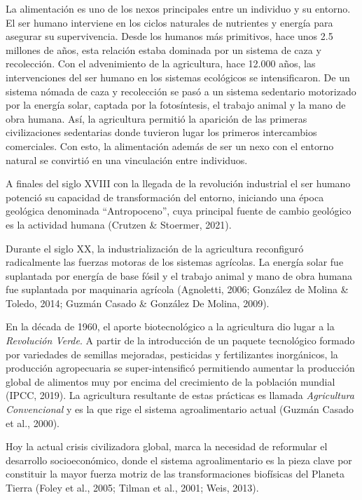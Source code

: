 \documentclass[a4paper, nobind]{templates/ociamthesis}
\begin{document}
La alimentación es uno de los nexos principales entre un individuo y su
entorno. El ser humano interviene en los ciclos naturales de nutrientes
y energía para asegurar su supervivencia. Desde los humanos más
primitivos, hace unos 2.5 millones de años, esta relación estaba
dominada por un sistema de caza y recolección. Con el advenimiento de la
agricultura, hace 12.000 años, las intervenciones del ser humano en los
sistemas ecológicos se intensificaron. De un sistema nómada de caza y
recolección se pasó a un sistema sedentario motorizado por la energía
solar, captada por la fotosíntesis, el trabajo animal y la mano de obra
humana. Así, la agricultura permitió la aparición de las primeras
civilizaciones sedentarias donde tuvieron lugar los primeros
intercambios comerciales. Con esto, la alimentación además de ser un
nexo con el entorno natural se convirtió en una vinculación entre
individuos.

A finales del siglo XVIII con la llegada de la revolución industrial el
ser humano potenció su capacidad de transformación del entorno,
iniciando una época geológica denominada ``Antropoceno'', cuya principal
fuente de cambio geológico es la actividad humana (Crutzen \& Stoermer, 2021).

Durante el siglo XX, la industrialización de la agricultura reconfiguró
radicalmente las fuerzas motoras de los sistemas agrícolas. La energía
solar fue suplantada por energía de base fósil y el trabajo animal y
mano de obra humana fue suplantada por maquinaria agrícola
(Agnoletti, 2006; González de Molina \& Toledo, 2014; Guzmán Casado \& González De Molina, 2009).

En la década de 1960, el aporte biotecnológico a la agricultura dio
lugar a la \emph{Revolución Verde}. A partir de la introducción de un paquete
tecnológico formado por variedades de semillas mejoradas, pesticidas y
fertilizantes inorgánicos, la producción agropecuaria se
super-intensificó permitiendo aumentar la producción global de alimentos
muy por encima del crecimiento de la población mundial
(IPCC, 2019). La agricultura resultante de estas prácticas es
llamada \emph{Agricultura Convencional} y es la que rige el sistema
agroalimentario actual (Guzmán Casado et al., 2000).

Hoy la actual crisis civilizadora global, marca la necesidad de
reformular el desarrollo socioeconómico, donde el sistema
agroalimentario es la pieza clave por constituir la mayor fuerza motriz
de las transformaciones biofísicas del Planeta Tierra (Foley et al., 2005; Tilman et al., 2001; Weis, 2013).
\end{document}
